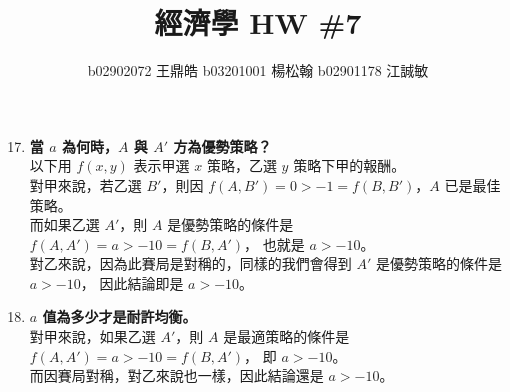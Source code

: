 \documentclass[12pt, a4paper]{article}
\title{\vspace{-1.5cm} 經濟學 HW \#7}
\author{b02902072 王鼎皓 \quad b03201001 楊松翰 \quad b02901178 江誠敏}
\begin{document}
\maketitle

\begin{enumerate}[label={\bf 8.\arabic*}]
  \setcounter{enumi}{16}
  \item {\bf 當 $a$ 為何時，$A$ 與 $A'$ 方為優勢策略？\\}
    以下用 $f(x, y)$ 表示甲選 $x$ 策略，乙選 $y$ 策略下甲的報酬。\\
    對甲來說，若乙選 $B'$，則因 $f(A, B') = 0 > -1 = f(B, B')$，$A$ 已是最佳策略。\\
    而如果乙選 $A'$，則 $A$ 是優勢策略的條件是 $f(A, A') = a > -10 = f(B, A')$，
    也就是 $a > -10$。\\
    對乙來說，因為此賽局是對稱的，同樣的我們會得到 $A'$ 是優勢策略的條件是 $a > -10$，
    因此結論即是 $a > -10$。

  \item {\bf $a$ 值為多少才是耐許均衡。\\}
    對甲來說，如果乙選 $A'$，則 $A$ 是最適策略的條件是 $f(A, A') = a > -10 = f(B, A')$，
    即 $a > -10$。\\
    而因賽局對稱，對乙來說也一樣，因此結論還是 $a > -10$。
    

\end{enumerate}
\end{document}
